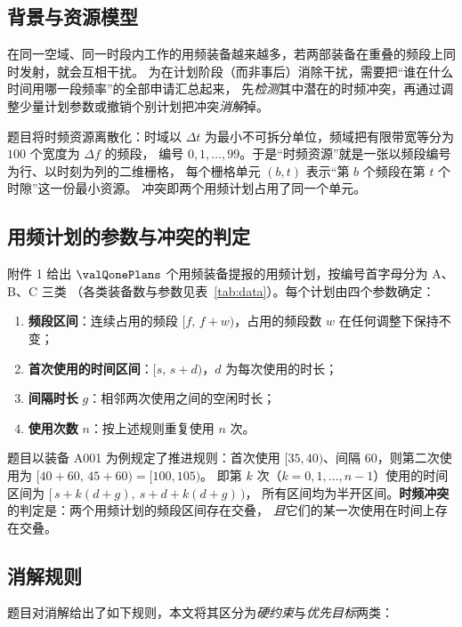 \subsection{背景与资源模型}

在同一空域、同一时段内工作的用频装备越来越多，若两部装备在重叠的频段上同时发射，就会互相干扰。
为在计划阶段（而非事后）消除干扰，需要把“谁在什么时间用哪一段频率”的全部申请汇总起来，
先\emph{检测}其中潜在的时频冲突，再通过调整少量计划参数或撤销个别计划把冲突\emph{消解}掉。

题目将时频资源离散化：时域以 $\Delta t$ 为最小不可拆分单位，频域把有限带宽等分为 $100$ 个宽度为 $\Delta f$ 的频段，
编号 $0,1,\dots,99$。于是“时频资源”就是一张以频段编号为行、以时刻为列的二维栅格，
每个栅格单元 $(b,t)$ 表示“第 $b$ 个频段在第 $t$ 个时隙”这一份最小资源。
冲突即两个用频计划占用了同一个单元。

\subsection{用频计划的参数与冲突的判定}

附件 1 给出 $\valQonePlans$ 个用频装备提报的用频计划，按编号首字母分为 A、B、C 三类
（各类装备数与参数见表~\ref{tab:data}）。每个计划由四个参数确定：

\begin{enumerate}[label=(\roman*),leftmargin=2.4em,itemsep=0.15em]
  \item \textbf{频段区间}：连续占用的频段 $[f,\,f+w)$，占用的频段数 $w$ 在任何调整下保持不变；
  \item \textbf{首次使用的时间区间}：$[s,\,s+d)$，$d$ 为每次使用的时长；
  \item \textbf{间隔时长} $g$：相邻两次使用之间的空闲时长；
  \item \textbf{使用次数} $n$：按上述规则重复使用 $n$ 次。
\end{enumerate}

题目以装备 A001 为例规定了推进规则：首次使用 $[35,40)$、间隔 $60$，则第二次使用为 $[40+60,\,45+60)=[100,105)$。
即第 $k$ 次（$k=0,1,\dots,n-1$）使用的时间区间为 $[\,s+k(d+g),\ s+d+k(d+g)\,)$，
所有区间均为半开区间。\textbf{时频冲突}的判定是：两个用频计划的频段区间存在交叠，
\emph{且}它们的某一次使用在时间上存在交叠。

\subsection{消解规则}

题目对消解给出了如下规则，本文将其区分为\emph{硬约束}与\emph{优先目标}两类：

